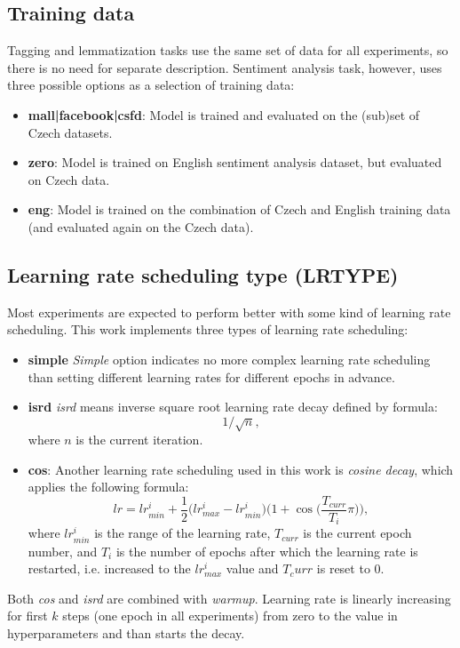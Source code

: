 \subsection{Training data}
Tagging and lemmatization tasks use the same set of data for all experiments, so there is no need for separate description. Sentiment analysis task, however, uses three possible options as a selection of training data:
\begin{itemize}
\item \textbf{mall|facebook|csfd}: Model is trained and evaluated on the (sub)set of Czech datasets.
\item \textbf{zero}: Model is trained on English sentiment analysis dataset, but evaluated on Czech data.
\item \textbf{eng}: Model is trained on the combination of Czech and English training data (and evaluated again on the Czech data). %
\end{itemize}
\subsection{Learning rate scheduling type (LRTYPE)}
Most experiments are expected to perform better with some kind of learning rate scheduling. This work implements three types of learning rate scheduling:
\begin{itemize}
\item \textbf{simple} \textit{Simple} option indicates no more complex learning rate scheduling than setting different learning rates for different epochs in advance.
\item \textbf{isrd} %
\textit{isrd} means inverse square root learning rate decay defined by formula: $$1/\sqrt{n},$$  where $n$ is the current iteration.
\item \textbf{cos}: Another learning rate scheduling used in this work is \textit{cosine decay}, %
which applies the following formula: $$lr=lr_{min}^{i} + \frac{1}{2}\bigg(lr_{max}^{i} - lr_{min}^{i}\bigg)\bigg(1+\cos\bigg(\frac{T_{curr}}{T_i}\pi\bigg)\bigg),$$ where $lr_{min}^{i}$ is the range of the learning rate, $T_{curr}$ is the current epoch number, and $T_i$ is the number of epochs after which the learning rate is restarted, i.e. increased to the $lr_{max}^{i}$ value and $T_curr$ is reset to 0.
\end{itemize}
Both \textit{cos} and \textit{isrd} are combined with \textit{warmup}. Learning rate is linearly increasing for first $k$ steps (one epoch in all experiments) from zero to the value in hyperparameters and than starts the decay.

